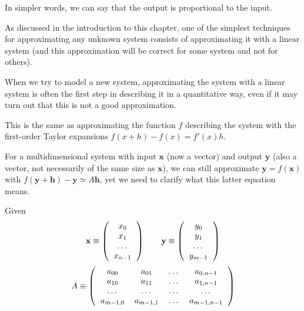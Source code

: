 \documentclass[justified,sixbynine]{tufte-book}
\theoremstyle{plain}%
\theoremstyle{definition}
\theoremstyle{remark}
\begin{document}
\begin{fullwidth}
In simpler words, we can say that the output is proportional to the input.

As discussed in the introduction to this chapter, one of the simplest techniques for approximating any unknown system consists of approximating it with a linear system (and this approximation will be correct for some system and not for others).

When we try to model a new system, approximating the system with a linear system is often the first step in describing it in a quantitative way, even if it may turn out that this is not a good approximation.

This is the same as approximating the function $f$ describing the system with the first-order Taylor expansions $f(x+h) - f(x) = f'(x) h$.

For a multidimensional system with input $\mathbf{x}$ (now a vector) and output $\mathbf{y}$ (also a vector, not necessarily of the same size as $\mathbf{x}$), we can still approximate $\mathbf{y}=f(\mathbf{x})$ with
$f(\mathbf{y}+\mathbf{h}) - \mathbf{y} \simeq A \mathbf{h}$, yet we need to clarify what this latter equation means.

Given
\begin{equation}
\mathbf{x} \equiv \left(\begin{tabular}{c}$x_0$\\$x_1$\\\dots\\$x_{n-1}$\end{tabular}\right)\qquad
\mathbf{y} \equiv \left(\begin{tabular}{c}$y_0$\\$y_1$\\\dots\\$y_{m-1}$\end{tabular}\right)
\end{equation}
\begin{equation}
A \equiv \left(\begin{tabular}{cccc}
$a_{00}$ & $a_{01}$ & \dots & $a_{0,n-1}$ \\
$a_{10}$ & $a_{11}$ & \dots & $a_{1,n-1}$ \\
\dots & \dots & \dots & \dots \\
$a_{m-1,0}$ & $a_{m-1,1}$ & \dots & $a_{m-1,n-1}$
\end{tabular}\right)
\end{equation}


\end{fullwidth}
\end{document}
